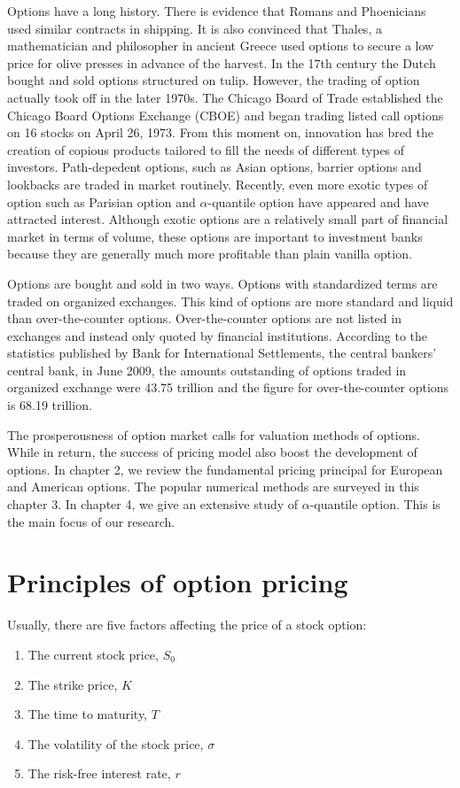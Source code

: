 \documentclass[12pt,oneside,titlepage]{book}
\begin{document}
Options have a long history. There is evidence that Romans and Phoenicians used similar contracts in shipping.  It is also convinced that Thales, a mathematician and philosopher in ancient Greece used options to secure a low price for olive presses in advance of the harvest. In the 17th century the Dutch bought and sold options structured on tulip. However, the trading of option actually took off in the later 1970s. The Chicago Board of Trade established the Chicago Board Options Exchange (CBOE) and began trading listed call options on 16 stocks on April 26, 1973.
From this moment on, innovation has bred the creation of copious products tailored to fill the needs of different types of investors. Path-depedent options, such as Asian options, barrier options and lookbacks are traded in market routinely.
Recently, even more exotic types of option such as Parisian option and ${\alpha}$-quantile option have appeared and have attracted interest. Although exotic options are a relatively small part of financial market in terms of volume, these options are important to investment banks because they are generally much more profitable than plain vanilla option.

Options are bought and sold in two ways. Options with standardized terms are traded on organized exchanges. This kind of options are more standard and liquid than over-the-counter options. Over-the-counter options are not listed in exchanges and instead only quoted by financial institutions. According to the statistics published by Bank for International Settlements, the central bankers' central bank, in June 2009, the amounts outstanding of options traded in organized exchange were 43.75 trillion and the figure for over-the-counter options is 68.19 trillion.

The prosperousness of option market calls for valuation methods of options. While in return, the success of pricing model also boost the development of options. In chapter 2, we review the fundamental pricing principal for European and American options. The popular numerical methods are surveyed in this chapter 3. In chapter 4, we give an extensive study of $\alpha$-quantile option. This is the main focus of our research.

\chapter{Principles of option pricing}

Usually, there are five factors affecting the price of a stock option:
\begin{enumerate}[1.]
\item The current stock price, $S_0$
\item The strike price, $K$
\item The time to maturity, $T$
\item The volatility of the stock price, $\sigma$
\item The risk-free interest rate, $r$
\end{enumerate}
\end{document}
